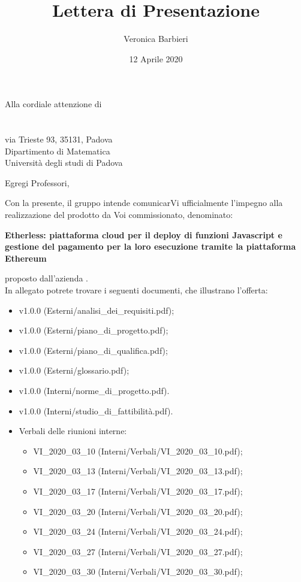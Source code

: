 \documentclass[a4paper]{letter}
\title{Lettera di Presentazione}
\author{Veronica Barbieri}
\begin{document}
\begin{letter} {Alla cordiale attenzione di \\ \TV \\ \RC \\ via Trieste 93, 35131, Padova\\ Dipartimento di Matematica \\ Università degli studi di Padova }
  \vspace*{-0.4\baselineskip}
\date{12 Aprile 2020}
\opening{Egregi Professori,}
  Con la presente, il gruppo \Gruppo{} intende comunicarVi ufficialmente l'impegno alla realizzazione del prodotto da Voi commissionato, denominato:
  \begin{center}
    \textbf{Etherless: piattaforma cloud per il deploy di funzioni Javascript e gestione del pagamento per la loro esecuzione tramite la piattaforma Ethereum}
  \end{center}
  proposto dall'azienda \Proponente.\\
  In allegato potrete trovare i seguenti documenti, che illustrano l'offerta:
  \begin{itemize}
    \item \AdR{} v1.0.0 (Esterni/analisi\_dei\_requisiti.pdf);
    \item \PdP{} v1.0.0 (Esterni/piano\_di\_progetto.pdf);
    \item \PdQ{} v1.0.0 (Esterni/piano\_di\_qualifica.pdf);
    \item \Glossario{} v1.0.0 (Esterni/glossario.pdf);
    \item \NdP{} v1.0.0 (Interni/norme\_di\_progetto.pdf).
    \item \SdF{} v1.0.0 (Interni/studio\_di\_fattibilità.pdf).
    \item Verbali delle riunioni interne:
      \begin{itemize}
        \item VI\_2020\_03\_10 (Interni/Verbali/VI\_2020\_03\_10.pdf);
        \item VI\_2020\_03\_13 (Interni/Verbali/VI\_2020\_03\_13.pdf);
        \item VI\_2020\_03\_17 (Interni/Verbali/VI\_2020\_03\_17.pdf);
        \item VI\_2020\_03\_20 (Interni/Verbali/VI\_2020\_03\_20.pdf);
        \item VI\_2020\_03\_24 (Interni/Verbali/VI\_2020\_03\_24.pdf);
        \item VI\_2020\_03\_27 (Interni/Verbali/VI\_2020\_03\_27.pdf);
        \item VI\_2020\_03\_30 (Interni/Verbali/VI\_2020\_03\_30.pdf);

\end{itemize}
\end{itemize}
\end{letter}
\end{document}
